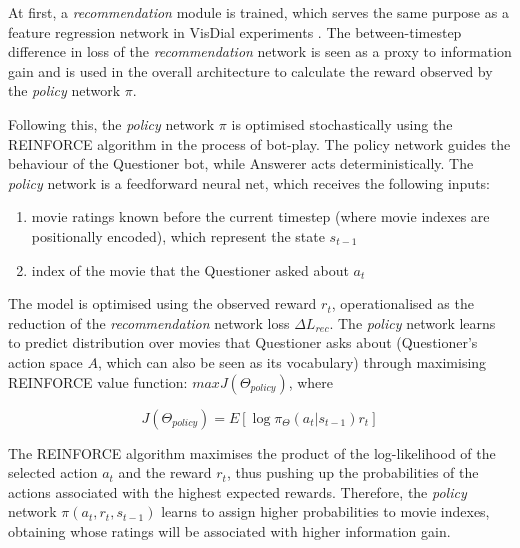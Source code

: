 At first, a \textit{recommendation} module is trained, which serves the same purpose as a feature regression network in VisDial experiments \citep{das2017learning}. The between-timestep difference in loss of the \textit{recommendation} network is seen as a proxy to information gain and is used in the overall architecture to calculate the reward observed by the \textit{policy} network $\pi$.

Following this, the \textit{policy} network $\pi$ is optimised stochastically using the REINFORCE algorithm in the process of bot-play. The policy network guides the behaviour of the Questioner bot, while Answerer acts deterministically. The \textit{policy} network is a feedforward neural net, which receives the following inputs: 

\begin{enumerate}
    \item movie ratings known before the current timestep (where movie indexes are positionally encoded), which represent the state $s_{t-1}$
    \item index of the movie that the Questioner asked about $a_t$
\end{enumerate}

The model is optimised using the observed reward $r_t$, operationalised as the reduction of the \textit{recommendation} network loss $\Delta L_{rec}$. The \textit{policy} network learns to predict distribution over movies that Questioner asks about (Questioner’s action space $A$, which can also be seen as its vocabulary) through maximising REINFORCE value function: $maxJ(\Theta_{policy})$, where

\begin{equation} 
\label{eq:policy_loss}
J(\Theta_{policy})=E[\log\pi_{\Theta}(a_t\vert s_{t-1})r_t]
\end{equation}

The REINFORCE algorithm maximises the product of the log-likelihood of the selected action $a_t$ and the reward $r_t$, thus pushing up the probabilities of the actions associated with the highest expected rewards. Therefore, the \textit{policy} network $\pi(a_t, r_t, s_{t-1})$ learns to assign higher probabilities to movie indexes, obtaining whose ratings will be associated with higher information gain.

